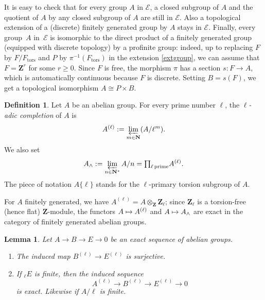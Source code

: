 \documentclass[JEP,XML,SOM,Unicode, NoEqCountersInSection]{cedram}
\let\mathcal\mathscr
\newenvironment{enumeratea}
{\bgroup\def\theenumi{\alph{enumi}}\begin{enumerate}}
{\end{enumerate}\egroup}
\newcommand\mto{\mathchoice{\longmapsto}{\mapsto}{\mapsto}{\mapsto}}
\newcommand{\tprod}{{\textstyle\prod}}
\theoremstyle{plain}
\newtheorem{lem}[theo]{Lemma}
\theoremstyle{definition}
\newtheorem{defi}[theo]{Definition}
\newcommand \ZZ {\mathbf{Z}}
\newcommand \NN {\mathbf{N}}
\newcommand \tors {\mathrm{tors}}
\begin{document}
It is easy to check that
for every group $A$ in $\mathcal E$, a closed subgroup of $A$ and
the quotient of $A$ by any closed subgroup of $A$ are still in $\mathcal E$.
Also a topological extension of a (discrete) finitely generated group by $A$
stays in $\mathcal E$. Finally, every group~$A$ in~$\mathcal E$ is isomorphic
to the direct product of a finitely generated
group (equipped with discrete topology) by a profinite group: indeed, up to replacing $F$ by
$F/F_\tors$ and $P$ by $\pi^{-1}(F_\tors)$
in the extension \eqref{extgroup}, we can assume
that $F=\ZZ^r$ for some $r \geq 0$. Since $F$ is free, the morphism
$\pi$ has a section $s: F \to A$, which is automatically continuous
because $F$ is discrete. Setting $B=s(F)$, we get a topological isomorphism
$A \cong P \times B$.

\begin{defi}
Let $A$ be an abelian group. For every prime number $\ell$,
the \emph{$\ell$-adic completion} of $A$ is
\[
A^{(\ell)}:=\varprojlim_{m \in \NN} (A/\ell^m).
\] We also
set
\[
A_{\wedge}:=\varprojlim_{n \in \NN^*}
A/n=\tprod_{\ell \, \mathrm{prime}} A^{(\ell)}.
\]
The piece of notation $A \{\ell\}$ stands for the $\ell$-primary
torsion subgroup of $A$.
\end{defi}

For $A$ finitely generated, we have
$A^{(\ell)}=A \otimes_{\ZZ} \ZZ_{\ell}$; since $\ZZ_{\ell}$ is a torsion-free
(hence flat) $\ZZ$-module, the functors $A \mto A^{(\ell)}$ and
$A \mto A_{\wedge}$ are exact in the category of finitely generated
abelian groups.

\pagebreak[2]
\begin{lem} \label{exactcomp}
Let $A \to B \to E \to 0$ be an exact sequence of abelian groups.
\begin{enumeratea}
\item\label{exactcompa}
The induced map $B^{(\ell)} \to E^{(\ell)}$ is surjective.

\item\label{exactcompb}
If $_{\ell} E$ is finite, then the induced sequence
\[
A^{(\ell)} \to B^{(\ell)} \to E^{(\ell)} \to 0
\]
is exact. Likewise if $A/\ell$ is finite.
\end{enumeratea}
\end{lem}
\end{document}
